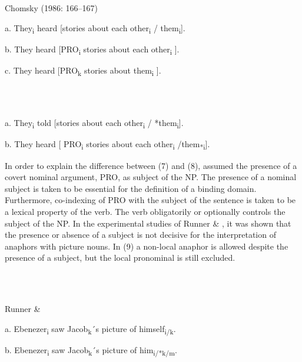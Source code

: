 \documentclass[output=paper]{langsci/langscibook}
\begin{document}
\ea%
    \label{ex:key:7}
    \gll\\
        \\
    \glt
    \z

          Chomsky (1986: 166–167)

  a.  They\textsubscript{i} heard [stories about each other\textsubscript{i} / them\textsubscript{i}].

b.  They heard [PRO\textsubscript{i} stories about each other\textsubscript{i} ].

c.  They heard [PRO\textsubscript{k} stories about them\textsubscript{i} ].

\ea%
    \label{ex:key:8}
    \gll\\
        \\
    \glt
    \z

          a.  They\textsubscript{i} told [stories about each other\textsubscript{i} / *them\textsubscript{i}].

  b.  They heard [ PRO\textsubscript{i} stories about each other\textsubscript{i} /them\textsubscript{*i}].

In order to explain the difference between (7) and (8), \citet{Chomsky1986} assumed the presence of a covert nominal argument, PRO, as subject of the NP. The presence of a nominal subject is taken to be essential for the definition of a binding domain. Furthermore, co-indexing of PRO with the subject of the sentence is taken to be a lexical property of the verb. The verb obligatorily or optionally controls the subject of the NP. In the experimental studies of Runner \& \citet{Kaiser2005}, it was shown that the presence or absence of a subject is not decisive for the interpretation of anaphors with picture nouns. In (9) a non-local anaphor is allowed despite the presence of a subject, but the local pronominal is still excluded.

\ea%
    \label{ex:key:9}
    \gll\\
        \\
    \glt
    \z

          Runner \& \citet[597]{Kaiser2005}

a.  Ebenezer\textsubscript{i} saw Jacob\textsubscript{k}´s picture of himself\textsubscript{i/k}.

  b.  Ebenezer\textsubscript{i} saw Jacob\textsubscript{k}´s picture of him\textsubscript{i/*k/m}.
\end{document}

